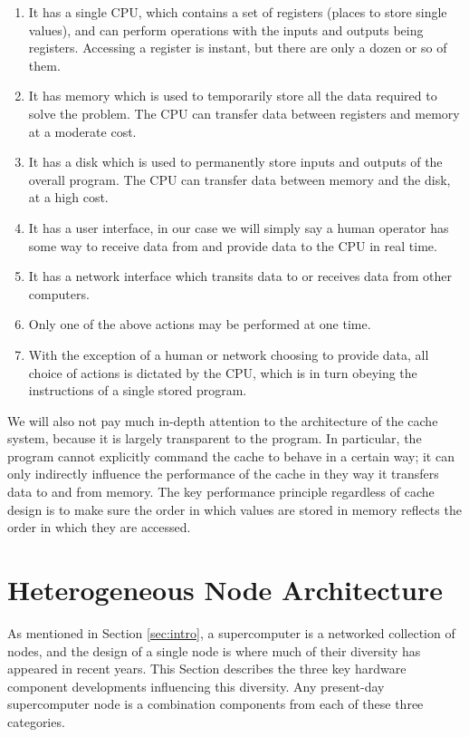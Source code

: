 \begin{enumerate}
\item It has a single CPU, which contains a set
of registers (places to store single values),
and can perform operations with the inputs
and outputs being registers.
Accessing a register is instant, but there are
only a dozen or so of them.
\item It has memory which is used to temporarily store
all the data required to solve the problem.
The CPU can transfer data between registers
and memory at a moderate cost.
\item It has a disk which is used to permanently store
inputs and outputs of the overall program.
The CPU can transfer data between memory
and the disk, at a high cost.
\item It has a user interface, in our case
we will simply say a human operator has
some way to receive data from and provide
data to the CPU in real time.
\item It has a network interface which transits
data to or receives data from other computers.
\item Only one of the above actions may be
performed at one time.
\item With the exception of a human or network choosing
to provide data, all choice of actions is
dictated by the CPU, which is in turn obeying
the instructions of a single stored program.
\end{enumerate}

We will also not pay much in-depth attention to the
architecture of the cache system, because it
is largely transparent to the program.
In particular, the program cannot explicitly
command the cache to behave in a certain way;
it can only indirectly influence the performance
of the cache in they way it transfers data to and
from memory.
The key performance principle regardless of cache design is
to make sure the order in which values are stored
in memory reflects the order in which they are accessed.

\section{Heterogeneous Node Architecture}
\label{sec:node_hw}

As mentioned in Section \ref{sec:intro}, a supercomputer is
a networked collection of nodes, and the design of a single node
is where much of their diversity has appeared in recent years.
This Section describes the three key hardware component developments
influencing this diversity.
Any present-day supercomputer node is a combination components
from each of these three categories.


